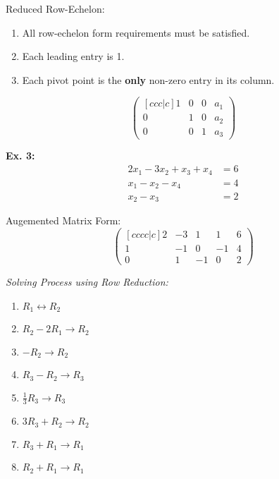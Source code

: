 \begin{definition}
    Reduced Row-Echelon:
    \begin{enumerate}
        \item All row-echelon form requirements must be satisfied.
        \item Each leading entry is 1.
        \item Each pivot point is the \textbf{only} non-zero entry in its column.
    \end{enumerate}
     \[
        \begin{pmatrix}[ccc|c]
            1 & 0 & 0 & a_1 \\
            0 & 1 & 0 & a_2 \\
            0 & 0 & 1 & a_3
        \end{pmatrix}
    \]
\end{definition}

\noindent
\textbf{Ex. 3:}
\begin{align}
    2x_1 - 3x_2 + x_3 + x_4 &= 6 \\
    x_1 - x_2 - x_4 &= 4 \\
    x_2 - x_3 &= 2
\end{align}

\noindent
\newline
Augemented Matrix Form:
\begin{equation}
    \begin{pmatrix}[cccc|c]
      2 & -3 & 1 & 1 & 6 \\
      1 & -1 & 0 & -1  & 4 \\
      0 & 1 & -1 & 0 & 2
    \end{pmatrix}
\end{equation}

\noindent
\newline
\textit{Solving Process using Row Reduction:}
\begin{enumerate}
    \item \(R_1 \leftrightarrow R_2\)
    \item \(R_2 - 2R_1 \rightarrow R_2\)
    \item \(-R_2 \rightarrow R_2\)
    \item \(R_3 - R_2 \rightarrow R_3\)
    \item \(\frac{1}{3} R_3 \rightarrow R_3\)
    \item \(3R_3 + R_2 \rightarrow R_2\)
    \item \(R_3 + R_1 \rightarrow R_1\)
    \item \(R_2 + R_1 \rightarrow R_1\)
\end{enumerate}

